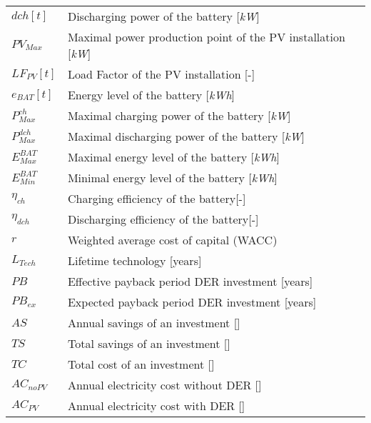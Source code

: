 \documentclass[master=ene,english]{kulemt}
\begin{document}
\begin{flushleft}
\begin{tabularx}{\textwidth}{@{}p{12mm}X@{}}
    $dch[t]$ & Discharging power of the battery [\textit{kW}]\\
    $PV_{Max}$ & Maximal power production point of the PV installation [\textit{kW}]\\
    $LF_{PV}[t]$ & Load Factor of the PV installation [-]\\
    $e_{BAT}[t]$ & Energy level of the battery [\textit{kWh}]\\
    $P_{Max}^{ch}$ & Maximal charging power of the battery [\textit{kW}]\\
    $P_{Max}^{dch}$ & Maximal discharging power of the battery [\textit{kW}]\\
    $E_{Max}^{BAT}$ & Maximal energy level of the battery [\textit{kWh}]\\
    $E_{Min}^{BAT}$ & Minimal energy level of the battery [\textit{kWh}]\\
    $\eta_{ch}$ & Charging efficiency of the battery[-]\\
    $\eta_{dch}$ & Discharging efficiency of the battery[-]\\
    $r$ & Weighted average cost of capital (WACC)\\
    $L_{Tech}$ & Lifetime technology [years]\\
    $PB$ & Effective payback period DER investment [years]\\
    $PB_{ex}$ & Expected payback period DER investment [years]\\
    $AS$ & Annual savings of an investment [\EUR{}]\\
    $TS$ & Total savings of an investment [\EUR{}]\\
    $TC$ & Total cost of an investment [\EUR{}]\\
    $AC_{noPV}$ & Annual electricity cost without DER [\EUR{}]\\
    $AC_{PV}$ & Annual electricity cost with DER [\EUR{}]
    \\
  \end{tabularx}
\end{flushleft}

\mainmatter
    
    
    
    
    
    

\appendixpage*          %
\appendix



\backmatter
\end{document}
